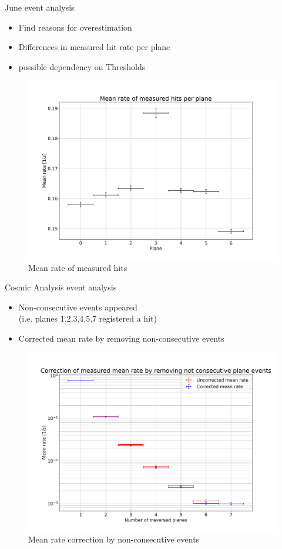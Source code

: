 \documentclass{beamer}
\begin{document}
\begin{frame}{June}
  \LARGE event analysis \normalsize \\[.1cm]
  \begin{itemize}
    \item Find reasons for overestimation
    \item Differences in measured hit rate per plane
    \item possible dependency on Thresholds
  \end{itemize}
  \begin{figure}[H]
    \centering
    \includegraphics[width=.8\textwidth]{rate_per_plane}
    \caption{Mean rate of measured hits}
  \end{figure}
\end{frame}

\begin{frame}{Cosmic Analysis}
  \LARGE event analysis \normalsize \\[.1cm]
  \begin{itemize}
    \item Non-consecutive events appeared\\
    (i.e. planes 1,2,3,4,5,7 registered a hit)
    \item Corrected mean rate by removing non-consecutive events
  \end{itemize}
  \begin{figure}[H]
    \centering
    \includegraphics[width=.6\textwidth]{rate_correction}
    \caption{Mean rate correction by non-consecutive events}
  \end{figure}
\end{frame}
\end{document}
